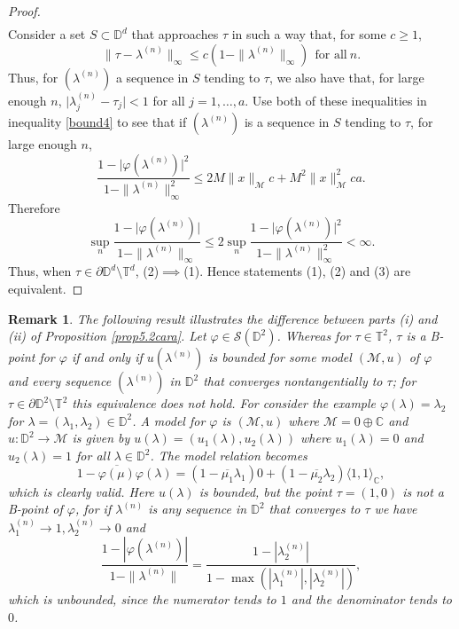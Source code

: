 \documentclass[11pt, reqno]{amsart}
\newtheorem{remark}[theorem]{Remark}
\newcommand\1{\boldsymbol {1}}
\newcommand{\M}{\mathcal{M}}
\newcommand{\T}{\mathbb{T}}
\newcommand{\D}{\mathbb{D}}
\newcommand{\C}{\mathbb{C}}
\newcommand{\ph}{\varphi}
\newcommand\la{\lambda}
\numberwithin{equation}{section}
\begin{document}
\begin{proof}
\begin{align}
\end{align} 
Consider a set $S\subset \mathbb{D}^{d}$ that approaches $\tau$ in such a way that, for some $c\geq 1$, 
$$\|\tau-\lambda^{(n)}\|_{\infty}\leq c(1-\|\lambda^{(n)}\|_{\infty})~~\text{for all}~n. $$ 
Thus, for $(\lambda^{(n)})$ a sequence in $S$ tending to $\tau$, we also have that, for large enough $n$, $\lvert \lambda^{(n)}_{j}-\tau_{j}\rvert <1$ for all $j=1,\hdots, a$. Use both of these inequalities in  inequality \eqref{bound4} to see that if $(\lambda^{(n)})$ is a sequence in $S$ tending to $\tau$, for large enough $n$,
    $$\dfrac{1-\lvert \varphi(\lambda^{(n)})\rvert^{2}}{1-\|\lambda^{(n)}\|_{\infty}^{2}} \leq 2M\|x\|_{\mathcal{M}}c+M^{2}\|x\|^{2}_{\mathcal{M}}ca.$$   
Therefore  
$$\sup_{n} \dfrac{1-\lvert \varphi(\lambda^{(n)})\rvert}{1-\|\lambda^{(n)}\|_{\infty}} \leq 2 \sup_{n} \dfrac{1-\lvert \varphi(\lambda^{(n)})\rvert^{2}}{1-\|\lambda^{(n)}\|_{\infty}^{2}}  <\infty.$$
Thus, when $\tau\in\partial\mathbb{D}^{d}\setminus\mathbb{T}^{d}$, (2)$\implies$(1). Hence statements (1), (2) and (3) are equivalent.\end{proof}

\begin{remark}
\rm The following result  \cite[Remark 5.3d]{AMYcara} illustrates 
 the difference between parts (i) and (ii) of Proposition \ref{prop5.2cara}. Let $\varphi \in \mathcal{S}(\D^2)$. Whereas for $\tau\in\T^2$, $\tau$ is a B-point for $\ph$ if and only if $u(\lambda^{(n)})$ is bounded for some model $(\M,u)$ of $\ph$ and every sequence $(\lambda^{(n)})$ in $\D^2$ that converges nontangentially to $\tau$; for $\tau\in \partial \D^2 \setminus \T^2$ this equivalence does not hold.  For consider the example $\ph(\lambda) = \lambda_2$ for $\lambda=(\lambda_1,\lambda_2) \in \D^2$.
A model for $\ph$ is $(\M,u)$ where $\M={0}\oplus\C$ and $u:\D^2 \to \M$ is given by $u(\la)=(u_1(\la),u_2(\la))$ where $u_1(\la)=0$ and $u_2(\la)=1$ for all $\la\in\D^2$. The model relation becomes
\[
1-\overline{\ph(\mu)}\ph(\la) = (1-\overline{\mu_1} \la_1)0+ (1-\overline{\mu_2} \la_2) \langle{1},{1} \rangle_\C,
\]
which is clearly valid.  Here $u(\la)$ is bounded, but the point $\tau=(1,0)$ is not a B-point of $\ph$, for if $\la^{(n)}$ is any sequence in $\D^2$ that converges to $\tau$ we have $\la^{(n)}_1 \to 1, \la^{(n)}_2 \to 0$ and
\[
\frac{1-|\ph(\la^{(n)})|}{1-\|\la^{(n)}\|} = \frac{1-|\la^{(n)}_2|}{1-\max(|\la^{(n)}_1|,|\la^{(n)}_2|)},
\]
which is unbounded, since the numerator tends to $1$ and the denominator tends to $0$. 
\end{remark}
\end{document}
